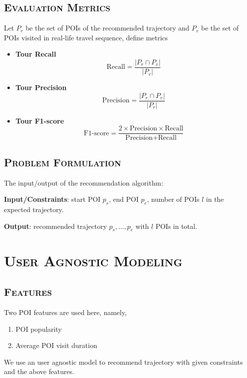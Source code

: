 \documentclass[11pt, a4paper]{article}
\begin{document}
\subsection{\textsc{Evaluation Metrics}} 
Let $P_r$ be the set of POIs of the recommended trajectory and $P_v$ be the set of POIs visited in real-life travel sequence,
define metrics\cite{lim15}
\begin{itemize}
\item \textbf{Tour Recall}
      \begin{equation*}
      \text{Recall} = \frac{\lvert P_r \cap P_v \rvert}{\lvert P_v \rvert}
      \end{equation*}
\item \textbf{Tour Precision}
      \begin{equation*}
      \text{Precision} = \frac{\lvert P_r \cap P_v \rvert}{\lvert P_r \rvert}
      \end{equation*}
\item \textbf{Tour F1-score}
      \begin{equation*}
      \text{F1-score} = \frac{2 \times \text{Precision} \times \text{Recall}}{\text{Precision} + \text{Recall}}
      \end{equation*}
\end{itemize}

\subsection{\textsc{Problem Formulation}}
\label{sec:formulation}
The input/output of the recommendation algorithm:
\begin{description}
\item \textbf{Input/Constraints}: start POI $p_s$, end POI $p_e$, number of POIs $l$ in the expected trajectory.
\item \textbf{Output}: recommended trajectory $p_s, \dots, p_e$ with $l$ POIs in total.
\end{description}


\section{\textsc{User Agnostic Modeling}}
\subsection{\textsc{Features}}
Two POI features are used here, namely,
\begin{enumerate}
\item POI popularity
\item Average POI visit duration
\end{enumerate}
We use an user agnostic model to recommend trajectory with given constraints and the above features.
\end{document}
